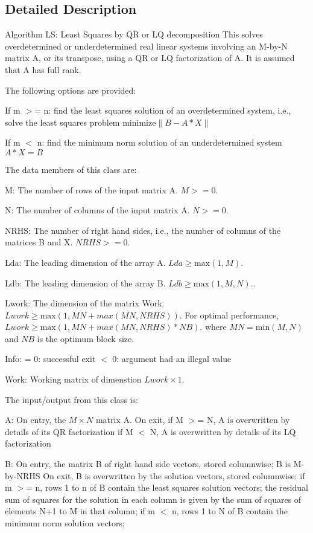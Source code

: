 \subsection{Detailed Description}
Algorithm L\-S\-: Least Squares by Q\-R or L\-Q decomposition This solves overdetermined or underdetermined real linear systems involving an M-\/by-\/\-N matrix A, or its transpose, using a Q\-R or L\-Q factorization of A. It is assumed that A has full rank.

The following options are provided\-:


\begin{DoxyEnumerate}
\item If m $>$= n\-: find the least squares solution of an overdetermined system, i.\-e., solve the least squares problem $ \mbox {minimize} \| B - A*X \| $
\item If m $<$ n\-: find the minimum norm solution of an underdetermined system $ A * X = B $
\end{DoxyEnumerate}

The data members of this class are\-:


\begin{DoxyItemize}
\item M\-: The number of rows of the input matrix A. $ M >= 0 $.
\item N\-: The number of columns of the input matrix A. $ N >= 0 $.
\item N\-R\-H\-S\-: The number of right hand sides, i.\-e., the number of columns of the matrices B and X. $ NRHS >=0 $.
\item Lda\-: The leading dimension of the array A. $ Lda \geq \mbox{max}(1,M) $.
\item Ldb\-: The leading dimension of the array B. $ Ldb \geq \mbox{max}(1,M,N). $.
\item Lwork\-: The dimension of the matrix Work. $ Lwork \geq \mbox{max}( 1, MN + max( MN, NRHS ) )$. For optimal performance, $ Lwork \geq \mbox{max}( 1, MN + max( MN, NRHS )*NB )$. where $ MN = \mbox{min}(M,N) $ and $ NB $ is the optimum block size.
\item Info\-: = 0\-: successful exit $<$ 0\-: argument had an illegal value
\item Work\-: Working matrix of dimenstion $ Lwork \times 1 $.
\end{DoxyItemize}

The input/output from this class is\-:
\begin{DoxyItemize}
\item A\-: On entry, the $ M \times N $ matrix A. On exit, if M $>$= N, A is overwritten by details of its Q\-R factorization if M $<$ N, A is overwritten by details of its L\-Q factorization
\item B\-: On entry, the matrix B of right hand side vectors, stored columnwise; B is M-\/by-\/\-N\-R\-H\-S On exit, B is overwritten by the solution vectors, stored columnwise\-: if m $>$= n, rows 1 to n of B contain the least squares solution vectors; the residual sum of squares for the solution in each column is given by the sum of squares of elements N+1 to M in that column; if m $<$ n, rows 1 to N of B contain the minimum norm solution vectors;
\end{DoxyItemize}

